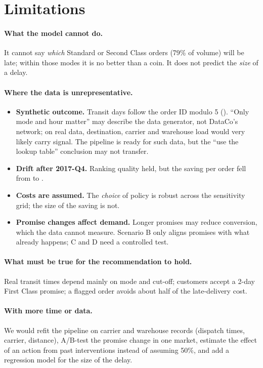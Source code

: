 \section{Limitations}
\label{sec:limitations}

\paragraph{What the model cannot do.} It cannot say \emph{which} Standard or Second Class orders
(79\% of volume) will be late; within those modes it is no better than a coin. It does not
predict the \emph{size} of a delay.

\paragraph{Where the data is unrepresentative.}
\begin{itemize}
  \item \textbf{Synthetic outcome.} Transit days follow the order ID modulo 5 ().
        ``Only mode and hour matter'' may describe the data generator, not DataCo's network; on
        real data, destination, carrier and warehouse load would very likely carry signal. The
        pipeline is ready for such data, but the ``use the lookup table'' conclusion may not
        transfer.
  \item \textbf{Drift after 2017-Q4.} Ranking quality held, but the saving per order fell from
         to .
  \item \textbf{Costs are assumed.} The \emph{choice} of policy is robust across the sensitivity
        grid; the size of the saving is not.
  \item \textbf{Promise changes affect demand.} Longer promises may reduce conversion, which the
        data cannot measure. Scenario B only aligns promises with what already happens;
        C and D need a controlled test.
\end{itemize}

\paragraph{What must be true for the recommendation to hold.} Real transit times depend mainly
on mode and cut-off; customers accept a 2-day First Class promise; a flagged order avoids about
half of the late-delivery cost.

\paragraph{With more time or data.} We would refit the pipeline on carrier and warehouse records
(dispatch times, carrier, distance), A/B-test the promise change in one market, estimate the
effect of an action from past interventions instead of assuming 50\%, and add a regression
model for the size of the delay.

